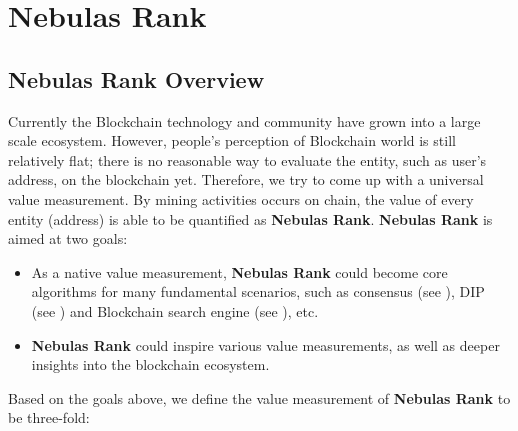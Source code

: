 \section{Nebulas Rank}
\label{sec:rank}

\subsection{Nebulas Rank Overview} \label{subsec:value}
Currently the Blockchain technology and community have grown into a large scale ecosystem. However, people's perception of Blockchain world is still relatively flat; there is no reasonable way to evaluate the entity, such as user's address, on the blockchain yet. Therefore, we try to come up with a universal value measurement. By mining activities occurs on chain, the value of every entity (address) is able to be quantified as \textbf{Nebulas Rank}. \textbf{Nebulas Rank} is aimed at two goals:
\begin{itemize}
	\item As a native value measurement, \textbf{Nebulas Rank} could become core algorithms for many fundamental scenarios, such as consensus (see ), DIP (see ) and Blockchain search engine (see ), etc.
	\item \textbf{Nebulas Rank} could inspire various value measurements, as well as deeper insights into the blockchain ecosystem.
\end{itemize}
Based on the goals above, we define the value measurement of \textbf{Nebulas Rank} to be three-fold:
